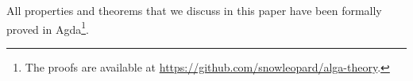 






All properties and theorems that we discuss in this paper have been
formally proved in Agda\footnote{The proofs are available at
\url{https://github.com/snowleopard/alga-theory}.}.
